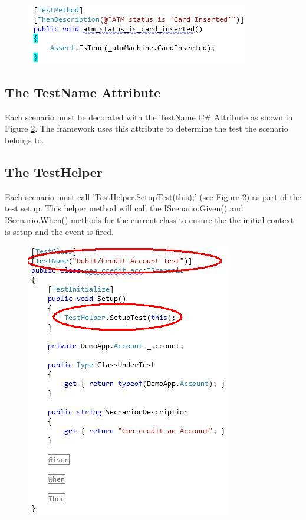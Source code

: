 \documentclass[a4paper,12pt]{article}
\begin{document}
\begin{center}
	\begin{figure}
		\includegraphics{ThenDesc.JPG}
			\caption{}	
			\label{fig3}       
	\end{figure}	
\end{center}

\subsection{The TestName Attribute}
Each scenario must be decorated with the TestName C\# Attribute as shown in Figure \ref{fig4}. The framework uses this attribute to determine the test the scenario belongs to.

\subsection{The TestHelper}
Each scenario must call 'TestHelper.SetupTest(this);' (see Figure \ref{fig4}) as part of the test setup. This helper method will call the IScenario.Given() and IScenario.When() methods for the current class to ensure the the initial context is setup and the event is fired.

\begin{center}
	\begin{figure}
		\includegraphics{TestNameAttribute.JPG}
			\caption{}	
			\label{fig4}       
	\end{figure}	
\end{center}
\end{document}
